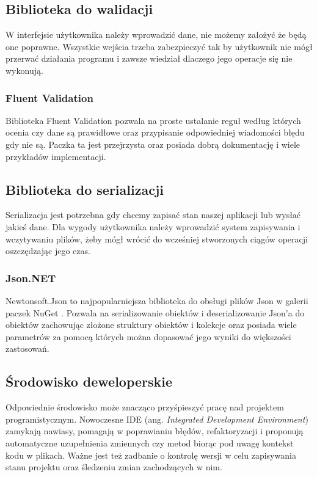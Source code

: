 \subsection{Biblioteka do walidacji}

W interfejsie użytkownika należy wprowadzić dane, nie możemy założyć że będą one poprawne.
Wszystkie wejścia trzeba zabezpieczyć tak by użytkownik nie mógł przerwać działania programu i zawsze wiedział dlaczego jego operacje się nie wykonują.

\subsubsection{Fluent Validation}

Biblioteka Fluent Validation \cite{fluentvalidation} pozwala na proste ustalanie reguł według których ocenia czy dane są prawidłowe oraz przypisanie odpowiedniej wiadomości błędu gdy nie są. Paczka ta jest przejrzysta oraz posiada dobrą dokumentację i wiele przykładów implementacji. 

\subsection{Biblioteka do serializacji}

Serializacja jest potrzebna gdy chcemy zapisać stan naszej aplikacji lub wysłać jakieś dane. Dla wygody użytkownika należy wprowadzić system zapisywania i wczytywaniu plików, żeby mógł wrócić do wcześniej stworzonych ciągów operacji oszczędzając jego czas. 

\subsubsection{Json.NET}

Newtonsoft.Json \cite{Newtonsoft.Json} to najpopularniejsza biblioteka do obsługi plików Json w galerii paczek NuGet \cite{jsonMostPop}. 
Pozwala na serializowanie obiektów i deserializowanie Json'a do obiektów zachowując złożone struktury obiektów i kolekcje oraz posiada wiele parametrów za pomocą których można dopasować jego wyniki do większości zastosowań. 

\subsection{Środowisko deweloperskie}

Odpowiednie środowisko może znacząco przyśpieszyć pracę nad projektem programistycznym. 
Nowoczesne IDE (ang. \textit{Integrated Development Environment}) zamykają nawiasy, pomagają w poprawianiu błędów, refaktoryzacji i proponują automatyczne uzupełnienia zmiennych czy metod biorąc pod uwagę kontekst kodu w plikach.
Ważne jest też zadbanie o kontrolę wersji w celu zapisywania stanu projektu oraz śledzeniu zmian zachodzących w nim.

